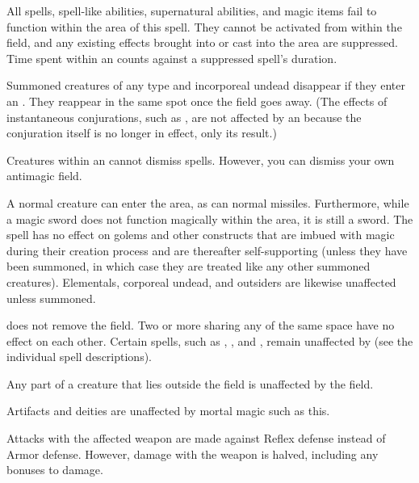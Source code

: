 \begin{spelleffect}
  All spells, spell-like abilities, supernatural abilities, and magic items fail to function within the area of this spell. They cannot be activated from within the field, and any existing effects brought into or cast into the area are suppressed. Time spent within an  counts against a suppressed spell's duration.
  \par Summoned creatures of any type and incorporeal undead disappear if they enter an . They reappear in the same spot once the field goes away. (The effects of instantaneous conjurations, such as , are not affected by an  because the conjuration itself is no longer in effect, only its result.)
  \par Creatures within an  cannot dismiss spells. However, you can dismiss your own antimagic field.
\end{spelleffect}
\begin{spellnotes}
  A normal creature can enter the area, as can normal missiles. Furthermore, while a magic sword does not function magically within the area, it is still a sword. The spell has no effect on golems and other constructs that are imbued with magic during their creation process and are thereafter self-supporting (unless they have been summoned, in which case they are treated like any other summoned creatures). Elementals, corporeal undead, and outsiders are likewise unaffected unless summoned.
  \par {} does not remove the field. Two or more  sharing any of the same space have no effect on each other. Certain spells, such as , , and , remain unaffected by  (see the individual spell descriptions).
  \par Any part of a creature that lies outside the field is unaffected by the field.
  \par Artifacts and deities are unaffected by mortal magic such as this. 
\end{spellnotes}

\spellrng{\rngclose}
\begin{spellsuccess}
    Attacks with the affected weapon are made against Reflex defense instead of Armor defense. However, damage with the weapon is halved, including any bonuses to damage.
\end{spellsuccess}

